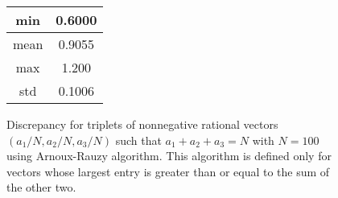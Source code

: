 \documentclass[preliminary,copyright,creativecommons]{eptcs}
\begin{document}
\begin{center}
\begin{figure}[ht!]
\begin{minipage}[c]{0.2\linewidth}
\begin{tabular}{c|c}
min & 0.6000 \\
\hline
mean & 0.9055 \\
\hline
max & 1.200 \\
\hline
std & 0.1006 \\
\end{tabular}
 \end{minipage}
\begin{minipage}[c]{0.8\linewidth}
\end{minipage}
 \caption{Discrepancy for triplets of nonnegative rational  vectors   $(a_1/N,a_2/N,a_3/N)$ such that $a_1+a_2+a_3=N$ with $N=100$ using Arnoux-Rauzy algorithm. This algorithm is defined only for vectors whose largest entry is greater than or equal to the sum of the other two.}
\label{fig:AR}
\end{figure}
\end{center}
\end{document}
